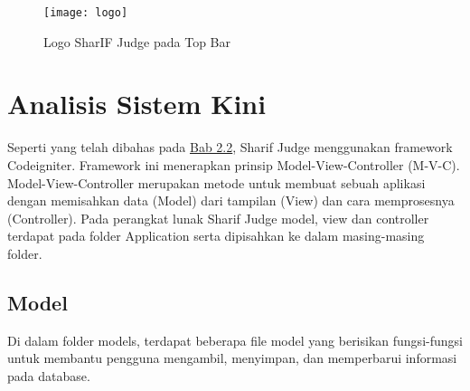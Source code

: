 \begin{figure}[H]
	\centering  
	\texttt{[image: logo]}  
	\caption[Logo SharIF Judge pada Top Bar]{Logo SharIF Judge pada Top Bar} 
	\label{fig:logo} 
\end{figure} 

\pagebreak

\section{Analisis Sistem Kini}

Seperti yang telah dibahas pada \hyperref[sec:sharifjudge]{Bab 2.2}, Sharif Judge menggunakan framework Codeigniter. Framework ini menerapkan prinsip Model-View-Controller (M-V-C). Model-View-Controller merupakan metode untuk membuat sebuah aplikasi dengan memisahkan data (Model) dari tampilan (View) dan cara memprosesnya (Controller). Pada perangkat lunak Sharif Judge model, view dan controller terdapat pada folder Application serta dipisahkan ke dalam masing-masing folder.  

\subsection{Model}
Di dalam folder models, terdapat beberapa file model yang berisikan fungsi-fungsi untuk membantu pengguna mengambil, menyimpan, dan memperbarui informasi pada database.

